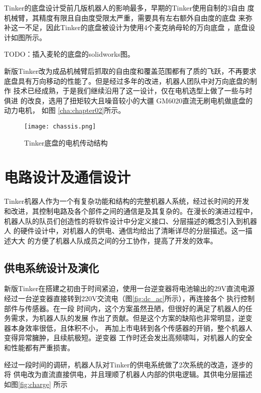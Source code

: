 Tinker的底盘设计受前几版机器人的影响最多，早期的Tinker使用自制的3自由
度机械臂，其精度有限且自由度受限太严重，需要具有左右额外自由度的底盘
来弥补这一不足，因此Tinker的底盘被设计为使用4个麦克纳母轮的万向底盘
\cite{tlale2008kinematics}，底盘设计如图所示。

TODO：插入麦轮的底盘的solidworks图。

新版Tinker改为成品机械臂后抓取的自由度和覆盖范围都有了质的飞跃，不再要求
底盘具有万向移动的性能了。但是经过多年的改进，机器人团队中对万向底盘的制作
技术已经成熟，于是我们继续沿用了这一设计，仅在电机选型上做了一些与时俱进
的改良，选用了扭矩较大且噪音较小的大疆 GM6020直流无刷电机做底盘的动力电机，
如图 \ref{cha:chapter02}所示。

\begin{figure}[ht] %
  \centering
  \texttt{[image: chassis.png]}
  \caption{Tinker底盘的电机传动结构}
  \label{fig:ur5_2f140}
\end{figure}


\section{电路设计及通信设计}

Tinker机器人作为一个有复杂功能和结构的完整机器人系统，经过长时间的开发
和改进，其控制电路及各个部件之间的通信是及其复杂的。在漫长的演进过程中，
机器人队的队员们创造性的将软件设计中分定义接口、分层描述的概念引入到机器人
的硬件设计中，对机器人的供电、通信均给出了清晰详尽的分层描述。这一描述大大
的方便了机器人队成员之间的分工协作，提高了开发的效率。

\subsection{供电系统设计及演化}

新版Tinker在搭建之初由于时间紧迫，使用一台逆变器将电池输出的29V直流电源
经过一台逆变器直接转到220V交流电（图\ref{fig:dc_ac}所示），再连接各个
执行控制部件与传感器。在一段
时间内，这个方案虽然丑陋，但很好的满足了机器人的任务需求，为机器人队的发展
作出了贡献。但是这个方案的缺陷也非常明显，逆变器本身效率很低，且体积不小，
再加上市电转到各个传感器的开销，整个机器人变得异常臃肿，且续航极短。逆变器
工作时还会发出高频啸叫，对机器人的安全和性能都有严重损害。

经过一段时间的调研，机器人队对Tinker的供电系统做了2次系统的改造，逐步的将
供电改为直流直接供电，并且理顺了机器人内部的供电逻辑。其供电分层描述如图\ref{fig:charge}
所示


